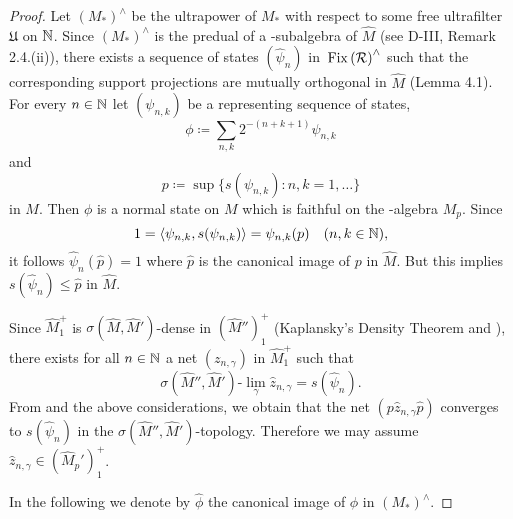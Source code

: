 \begin{proof}
Let $ (M_{*})^{\wedge} $  be the ultrapower of $ M_{*} $  with respect to some free ultrafilter $ \mathfrak{U} $  on $ \mathbb{N} $.
Since $ (M_{*})^{\wedge} $  is the predual of a \WA-subalgebra of $ \widehat{M} $  
(see D-III, Remark 2.4.(ii)), there exists a sequence of states $ (\hat{\psi}_{n}) $  in $ \mathop{}\mathrm{Fix}\left(\mathcal{R}\right)^{\wedge} $  such that the corresponding support projections are mutually orthogonal in $ \widehat{M} $  (Lemma 4.1).
For every $ n \in \mathbb{N} $  let $ (\psi_{n,k}) $  be a representing sequence of states, 
\[
\phi \coloneqq \sum_{n,k} 2^{-(n+k+1)} \psi_{n,k}
\]
and 
\[
p \coloneqq \sup\{s(\psi_{n,k}): n,k=1,\ldots\}
\]
in $ M $.
Then $ \phi $  is a normal state on $ M $  which is faithful on the \WA-algebra $ M_{p} $.
Since 
\[
1 = \langle\psi_{n,k},s(\psi_{n,k})\rangle = \psi_{n,k}(p) \quad (n,k \in \mathbb{N}) ,
\]
it follows $ \hat{\psi}_{n}(\hat{p}) = 1 $  where $ \hat{p} $  is the canonical image of $ p $  in $ \widehat{M} $.
But this implies $ s(\hat{\psi}_{n}) \leq \hat{p} $  in $ \widehat{M} $.

Since $ \widehat{M}_{1}^{+} $  is $ \sigma(\widehat{M},\widehat{M}') $-dense in $ (\widehat{M}'')_{1}^{+} $  (Kaplansky's Density Theorem \citet[1.9.1]{sakai:1971} and \citet[1.8.9 and 1.8.12]{sakai:1971}), there exists for all $ n \in \mathbb{N} $  a net $ (z_{n,\gamma}) $  in $ \widehat{M}_{1}^{+} $  such that
\[
\sigma(\widehat{M}'',\widehat{M}')\text{-}\lim_{\gamma} \hat{z}_{n,\gamma} = s(\hat{\psi}_{n}).
\]
From \citet[1.7.8]{sakai:1971} and the above considerations, we obtain that the net $ (p\hat{z}_{n,\gamma}\hat{p}) $  converges to $ s(\hat{\psi}_{n}) $  in the $ \sigma(\widehat{M}'',\widehat{M}') $-topology.
Therefore we may assume $ \hat{z}_{n,\gamma} \in (\widehat{M}_{p}')_{1}^{+} $.

In the following we denote by $ \hat{\phi} $  the canonical image of $ \phi $  in $ (M_{*})^{\wedge} $.


\end{proof}
